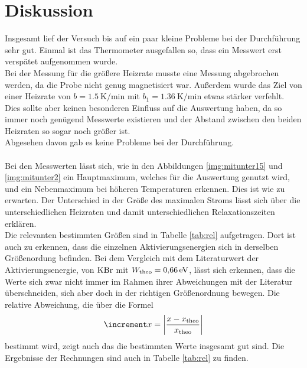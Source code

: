\newpage
\section{Diskussion}

\noindent
Insgesamt lief der Versuch bis auf ein paar kleine Probleme bei der Durchführung sehr gut.
Einmal ist das Thermometer ausgefallen so, dass ein Messwert erst verspätet aufgenommen wurde.\\
Bei der Messung für die größere Heizrate musste eine Messung abgebrochen werden, da die Probe nicht genug magnetisiert war.
Außerdem wurde das Ziel von einer Heizrate von $b =\SI{1.5}{\kelvin\per\minute}$ mit $b_1 =\SI{1.36}{\kelvin\per\minute}$ etwas stärker verfehlt.
Dies sollte aber keinen besonderen Einfluss auf die Auswertung haben, da so immer noch genügend Messwerte existieren und der Abstand zwischen den beiden Heizraten so sogar noch größer ist.\\
Abgesehen davon gab es keine Probleme bei der Durchführung.\\\\

\noindent
Bei den Messwerten lässt sich, wie in den Abbildungen \ref{img:mitunter15} und \ref{img:mitunter2} ein Hauptmaximum, welches für die Auswertung genutzt wird, und ein Nebenmaximum bei höheren Temperaturen erkennen.
Dies ist wie zu erwarten. Der Unterschied in der Größe des maximalen Stroms lässt sich über die unterschiedlichen Heizraten und damit unterschiedlichen Relaxationszeiten erklären.\\
Die relevanten bestimmten Größen sind in Tabelle \ref{tab:rel} aufgetragen. 
Dort ist auch zu erkennen, dass die einzelnen Aktivierungsenergien sich in derselben Größenordung befinden. 
Bei dem Vergleich mit dem Literaturwert der Aktivierungsenergie, von $\ce{KBr}$ mit $W_{\text{theo}} = \SI{0.66}{\electronvolt}$\cite{lit}, 
lässt sich erkennen, dass die Werte sich zwar nicht immer im Rahmen ihrer Abweichungen mit der Literatur überschneiden, sich aber doch in der richtigen Größenordnung bewegen.
Die relative Abweichung, die über die Formel  
\begin{equation*}
    \increment x = \left| \frac{x - x_\t{theo}}{x_\t{theo}} \right|
\end{equation*}
bestimmt wird, zeigt auch das die bestimmten Werte insgesamt gut sind. Die Ergebnisse der Rechnungen sind auch in Tabelle \ref{tab:rel} zu finden.

